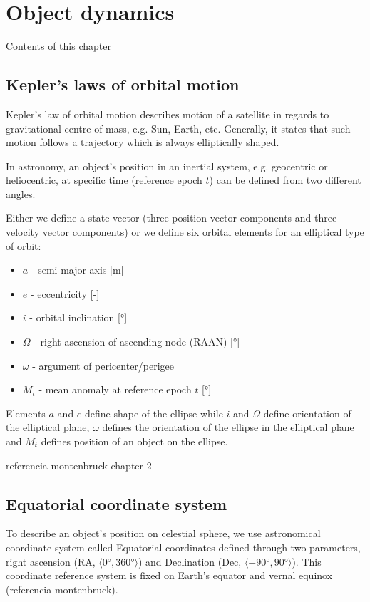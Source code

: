 \chapter{Object dynamics}\label{chap:object_dynamics}

	Contents of this chapter 

\section{Kepler's laws of orbital motion}\label{sec:kepler}
	
	Kepler's law of orbital motion describes motion of a satellite in regards to gravitational centre of mass, e.g. Sun, Earth, etc. Generally, it states that such motion follows a trajectory which is always elliptically shaped.
	
	In astronomy, an object's position in an inertial system, e.g. geocentric or heliocentric, at specific time (reference epoch $t$) can be defined from two different angles.
	
	Either we define a state vector (three position vector components and three velocity vector components) or we define six orbital elements for an elliptical type of orbit:
	
	\begin{itemize}
		\item $a$ - semi-major axis [m]
		\item $e$ - eccentricity [-]
		\item $i$ - orbital inclination [°]
		\item $\Omega$ - right ascension of ascending node (RAAN) [°]
		\item $\omega$ - argument of pericenter/perigee
		\item $M_t$ - mean anomaly at reference epoch $t$ [°]
	\end{itemize}
	
	Elements $a$ and $e$ define shape of the ellipse while $i$ and $\Omega$ define orientation of the elliptical plane, $\omega$ defines the orientation of the ellipse in the elliptical plane and $M_t$ defines position of an object on the ellipse.
	
	referencia montenbruck chapter 2

\section{Equatorial coordinate system}\label{sec:ra_dec}
	
	To describe an object's position on celestial sphere, we use astronomical coordinate system called Equatorial coordinates defined through two parameters, right ascension (RA, $\langle\ang{0},\ang{360}\rangle$) and Declination (Dec, $\langle\ang{-90},\ang{90}\rangle$). This coordinate reference system is fixed on Earth's equator and vernal equinox (referencia montenbruck).
	
